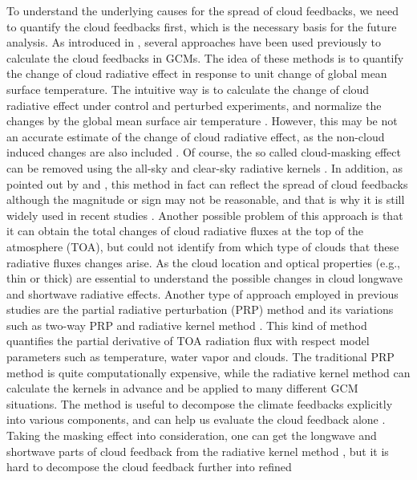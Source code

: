

To understand the underlying causes for the spread of cloud feedbacks, we need to quantify the cloud feedbacks first, which is the necessary basis for the future analysis. As introduced in , several approaches have been used previously to calculate the cloud feedbacks in GCMs. The idea of these methods is to quantify the change of cloud radiative effect in response to unit change of global mean surface temperature. The intuitive way is to calculate the change of cloud radiative effect under control and perturbed experiments, and normalize the changes by the global mean surface air temperature \citep[e.g.,][]{Cess1990intercomparison,Cess1996cloud}. However, this may be not an accurate estimate of the change of cloud radiative effect, as  the non-cloud induced changes are also included \cite[e.g.,][]{Soden2004}. Of course, the so called cloud-masking effect can be removed using the all-sky and clear-sky radiative kernels \citep[Details in ;][]{Shell2008}. In addition, as pointed out by \cite{Soden2008} and \cite{Vial2013}, this method in fact can reflect the spread of cloud feedbacks although the magnitude or sign may not be reasonable, and that is why it is still widely used in recent studies \citep[e.g.,][]{Webb2015}. Another possible problem of this approach is that it can obtain the total changes of cloud radiative fluxes at the top of the atmosphere (TOA), but could not identify from which type of clouds that these radiative fluxes changes arise. As the cloud location and optical properties (e.g., thin or thick) are essential to understand the possible changes in cloud longwave and shortwave radiative effects. Another type of approach employed in previous studies are the partial radiative perturbation (PRP) method \citep{Wetherald1988cloud} and its variations such as two-way PRP \citep[e.g.,][]{Colman1997} and radiative kernel method \citep[e.g.,][]{Soden2008,Shell2008,Huang2017,Pendergrass2018,Smith2020}. This kind of method quantifies the partial derivative of TOA radiation flux with respect model parameters such as temperature, water vapor and clouds. The traditional PRP method is quite computationally expensive, while the radiative kernel method can calculate the kernels in advance and be applied to many different GCM situations. The method is useful to decompose the climate feedbacks explicitly into various components, and can help us evaluate the cloud feedback alone \citep[e.g.,][]{Soden2004,Soden2006,Soden2008}. Taking the masking effect into consideration, one can get the longwave and shortwave parts of cloud feedback from the radiative kernel method \citep[e.g.,][]{Soden2008,Caldwell2016quantifying}, but it is hard to decompose the cloud feedback further into refined 